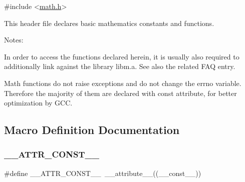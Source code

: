 \begin{DoxyCode}
\textcolor{preprocessor}{#include <\hyperlink{math_8h}{math.h}>} 
\end{DoxyCode}


This header file declares basic mathematics constants and functions.

\begin{DoxyParagraph}{Notes\+:}

\begin{DoxyItemize}
\item In order to access the functions declared herein, it is usually also required to additionally link against the library {\ttfamily libm.\+a}. See also the related F\+AQ entry.
\item Math functions do not raise exceptions and do not change the {\ttfamily errno} variable. Therefore the majority of them are declared with const attribute, for better optimization by G\+CC. 
\end{DoxyItemize}
\end{DoxyParagraph}


\subsection{Macro Definition Documentation}
\mbox{\label{group__avr__math_ga87f6b1b3880d945610873b9da382e5d4}} 
\subsubsection{\texorpdfstring{\+\_\+\+\_\+\+A\+T\+T\+R\+\_\+\+C\+O\+N\+S\+T\+\_\+\+\_\+}{\_\_ATTR\_CONST\_\_}}
{\footnotesize\ttfamily \#define \+\_\+\+\_\+\+A\+T\+T\+R\+\_\+\+C\+O\+N\+S\+T\+\_\+\+\_\+~\+\_\+\+\_\+attribute\+\_\+\+\_\+((\+\_\+\+\_\+const\+\_\+\+\_\+))}

\mbox{\label{group__avr__math_ga3e085dcc8e09f400136816dbc2a56a25}} 
